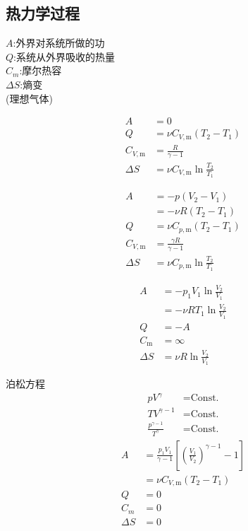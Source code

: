 \documentclass[10pt]{article}
\numberwithin{equation}{section}
\begin{document}
\begin{multicols}{3}
\begin{CJK}{UTF8}{song}
\section{热力学过程}
$A$:外界对系统所做的功\\
$Q$:系统从外界吸收的热量\\
$C_m$:摩尔热容\\
$\Delta S$:熵变\\
(理想气体)
\begin{center}
\end{center}
\begin{align}
  A&=0 \\
  Q&=\nu C_{V,\textrm{m}}(T_2-T_1) \\
  C_{V,\textrm{m}}&=\frac{R}{\gamma-1} \\
  \Delta S&=\nu C_{V,\textrm{m}}\ln\frac{T_2}{T_1}
\end{align}
\begin{center}
\end{center}
\begin{align}
  A&=-p(V_{2}-V_{1})\nonumber \\ &=-\nu R(T_2-T_1) \\
  Q&=\nu C_{p,\textrm{m}}(T_2-T_1) \\
  C_{V,\textrm{m}}&=\frac{\gamma R}{\gamma-1} \\
  \Delta S&=\nu C_{p,\textrm{m}}\ln\frac{T_2}{T_1}
\end{align}
\begin{center}
\end{center}
\begin{align}
  A&=-p_1V_{1}\ln\frac{V_{2}}{V_{1}} \nonumber \\&=-\nu RT_1\ln\frac{V_{2}}{V_{1}} \\
  Q&=-A \\
  C_{\textrm{m}}&=\infty \\
  \Delta S&=\nu R\ln\frac{V_2}{V_1}
\end{align}
\begin{center}
\end{center}
泊松方程
\begin{align}
  pV^{\gamma}&=\textrm{Const.} \\
  TV^{\gamma-1}&=\textrm{Const.} \\
  \frac{p^{\gamma -1}}{T^{\gamma}}&=\textrm{Const.}
\end{align}
\begin{align}
  A&= \frac{p_1V_{1}}{\gamma -1}\left[\left(\frac{V_{1}}{V_{2}}\right)^{\gamma -1}-1\right]\nonumber\\ &=\nu C_{V,\textrm{m}}(T_2-T_1) \\
  Q&=0 \\
  C_m&=0 \\
  \Delta S&=0
\end{align}
\begin{center}
\end{center}


\end{CJK}
\end{multicols}
\end{document}
